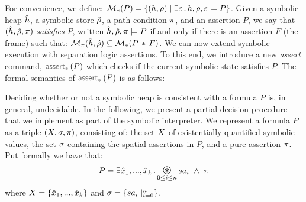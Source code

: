 For convenience, we define: {\small $\mathcal{M}_{*}(P) = \left\{ (h, \rho) \mid \exists \varepsilon \, . \,  h, \rho, \varepsilon \models P  \right\}$}. 
Given a symbolic heap $\hat{h}$, a symbolic store $\hat\rho$, a path condition $\pi$, and 
an assertion $P$, we say that  $(\hat{h}, \hat\rho, \pi)$ \emph{satisfies} $P$, 
written $\hat{h}, \hat\rho, \pi \models P$ if and only if there is an assertion $F$ (the frame)
such that:  $\mathcal{M}_{\pi}(\hat{h}, \hat\rho) \subseteq \mathcal{M}_{*}(P \, * \, F)$. 
%
We can now extend \jsil symbolic execution with separation logic assertions. 
To this end, we introduce a new \emph{assert} command, $\sepassert(P)$ which checks
if the current symbolic state satisfies $P$. 
The formal semantics of $\sepassert(P)$ is as follows: 
{\small {}}

Deciding whether or not a symbolic heap is consistent with a formula $P$ is, in general, 
undecidable. In the following, we present a partial decision procedure that we  
implement as part of the \jsil symbolic interpreter. 
We represent a formula $P$ as a triple 
$(X, \sigma, \pi)$, consisting of: 
 the set $X$ of existentially quantified symbolic values, 
 the set $\sigma$ containing the spatial assertions in $P$, and 
 a pure assertion $\pi$. 
Put formally we have that: 
\begin{equation}
P = \exists \svar_1, ..., \svar_k \, . \bigoast_{0 \leq i \leq n} \sass_i \ \wedge \ \pfs
\end{equation}
where $X = \{ \hat{x}_1, ..., \hat{x}_k \}$ and $\sigma = \{ sa_i \mid_{i = 0}^n \}$. 


